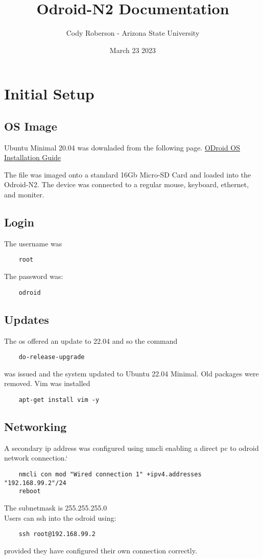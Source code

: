 \documentclass[11pt,letterpaper]{article}
\begin{document}
\date{March 23 2023}
\title{Odroid-N2 Documentation}
\author{Cody Roberson - Arizona State University}
\maketitle
\newpage 
\tableofcontents
\newpage
\section{Initial Setup}
\subsection{OS Image}
Ubuntu Minimal 20.04 was downladed from the following page. 
\href{https://wiki.odroid.com/getting_started/os_installation_guide#operating_systems_we_re_providing}{ODroid OS Installation Guide}

The file was imaged onto a standard 16Gb Micro-SD Card and loaded into the Odroid-N2.
The device was connected to a regular mouse, keyboard, ethernet, and moniter.

\subsection{Login}
The username was
\begin{verbatim}
    root
\end{verbatim}
The password was:
\begin{verbatim}
    odroid
\end{verbatim}
\subsection{Updates}
The os offered an update to 22.04 and so the command
\begin{verbatim}
    do-release-upgrade
\end{verbatim}
was issued and the system updated to Ubuntu 22.04 Minimal.
Old packages were removed.
Vim was installed
\begin{verbatim}
    apt-get install vim -y
\end{verbatim}
\subsection{Networking}
A secondary ip address was configured using nmcli enabling a direct pc to odroid
network connection.`
\begin{verbatim}
    nmcli con mod "Wired connection 1" +ipv4.addresses "192.168.99.2"/24
    reboot
\end{verbatim}
The subnetmask is 255.255.255.0\\
Users can ssh into the odroid using:
\begin{verbatim}
    ssh root@192.168.99.2
\end{verbatim}
provided they have configured their own connection correctly.
\end{document}

